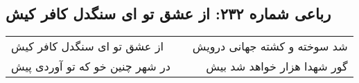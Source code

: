 \begin{center}
\section*{رباعی شماره ۲۳۲: از عشق تو ای سنگدل کافر کیش}
\label{sec:sh232}
\begin{longtable}{l p{0.5cm} r}
از عشق تو ای سنگدل کافر کیش
&&
شد سوخته و کشته جهانی درویش
\\
در شهر چنین خو که تو آوردی پیش
&&
گور شهدا هزار خواهد شد بیش
\\
\end{longtable}
\end{center}
